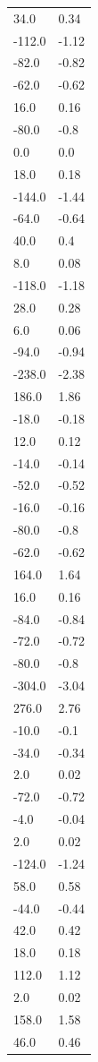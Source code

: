 \begin{longtable}{ll}
34.0 & 0.34 \\
-112.0 & -1.12 \\
-82.0 & -0.82 \\
-62.0 & -0.62 \\
16.0 & 0.16 \\
-80.0 & -0.8 \\
0.0 & 0.0 \\
18.0 & 0.18 \\
-144.0 & -1.44 \\
-64.0 & -0.64 \\
40.0 & 0.4 \\
8.0 & 0.08 \\
-118.0 & -1.18 \\
28.0 & 0.28 \\
6.0 & 0.06 \\
-94.0 & -0.94 \\
-238.0 & -2.38 \\
186.0 & 1.86 \\
-18.0 & -0.18 \\
12.0 & 0.12 \\
-14.0 & -0.14 \\
-52.0 & -0.52 \\
-16.0 & -0.16 \\
-80.0 & -0.8 \\
-62.0 & -0.62 \\
164.0 & 1.64 \\
16.0 & 0.16 \\
-84.0 & -0.84 \\
-72.0 & -0.72 \\
-80.0 & -0.8 \\
-304.0 & -3.04 \\
276.0 & 2.76 \\
-10.0 & -0.1 \\
-34.0 & -0.34 \\
2.0 & 0.02 \\
-72.0 & -0.72 \\
-4.0 & -0.04 \\
2.0 & 0.02 \\
-124.0 & -1.24 \\
58.0 & 0.58 \\
-44.0 & -0.44 \\
42.0 & 0.42 \\
18.0 & 0.18 \\
112.0 & 1.12 \\
2.0 & 0.02 \\
158.0 & 1.58 \\
46.0 & 0.46 \\

\end{longtable}
